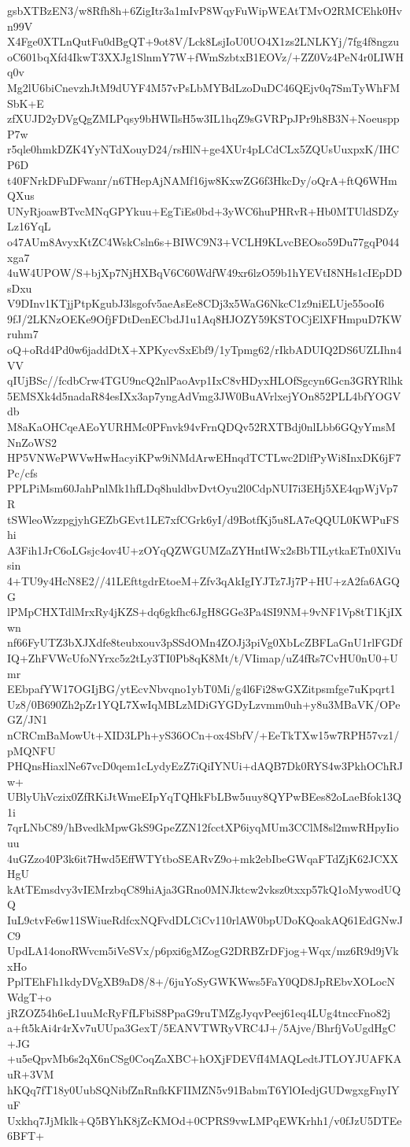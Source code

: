 gsbXTBzEN3/w8Rfh8h+6ZigItr3a1mIvP8WqyFuWipWEAtTMvO2RMCEhk0Hvn99V
X4Fge0XTLnQutFu0dBgQT+9ot8V/Lck8LsjIoU0UO4X1zs2LNLKYj/7fg4f8ngzu
oC601bqXfd4IkwT3XXJg1SlnmY7W+fWmSzbtxB1EOVz/+ZZ0Vz4PeN4r0LIWHq0v
Mg2lU6biCnevzhJtM9dUYF4M57vPsLbMYBdLzoDuDC46QEjv0q7SmTyWhFMSbK+E
zfXUJD2yDVgQgZMLPqsy9bHWIlsH5w3IL1hqZ9sGVRPpJPr9h8B3N+NoeusppP7w
r5qle0hmkDZK4YyNTdXouyD24/rsHlN+ge4XUr4pLCdCLx5ZQUsUuxpxK/IHCP6D
t40FNrkDFuDFwanr/n6THepAjNAMf16jw8KxwZG6f3HkcDy/oQrA+ftQ6WHmQXus
UNyRjoawBTvcMNqGPYkuu+EgTiEs0bd+3yWC6huPHRvR+Hb0MTUldSDZyLz16YqL
o47AUm8AvyxKtZC4WskCsln6s+BIWC9N3+VCLH9KLvcBEOso59Du77gqP044xga7
4uW4UPOW/S+bjXp7NjHXBqV6C60WdfW49xr6lzO59b1hYEVtI8NHs1cIEpDDsDxu
V9DInv1KTjjPtpKgubJ3lsgofv5aeAsEe8CDj3x5WaG6NkcC1z9niELUje55ooI6
9fJ/2LKNzOEKe9OfjFDtDenECbdJ1u1Aq8HJOZY59KSTOCjElXFHmpuD7KWruhm7
oQ+oRd4Pd0w6jaddDtX+XPKycvSxEbf9/1yTpmg62/rIkbADUIQ2DS6UZLIhn4VV
qIUjBSc//fcdbCrw4TGU9ncQ2nlPaoAvp1IxC8vHDyxHLOfSgcyn6Gcn3GRYRlhk
5EMSXk4d5nadaR84esIXx3ap7yngAdVmg3JW0BuAVrlxejYOn852PLL4bfYOGVdb
M8aKaOHCqeAEoYURHMc0PFnvk94vFrnQDQv52RXTBdj0nlLbb6GQyYmsMNnZoWS2
HP5VNWePWVwHwHacyiKPw9iNMdArwEHnqdTCTLwc2DlfPyWi8InxDK6jF7Pc/cfs
PPLPiMsm60JahPnlMk1hfLDq8huldbvDvtOyu2l0CdpNUI7i3EHj5XE4qpWjVp7R
tSWleoWzzpgjyhGEZbGEvt1LE7xfCGrk6yI/d9BotfKj5u8LA7eQQUL0KWPuFShi
A3Fih1JrC6oLGsjc4ov4U+zOYqQZWGUMZaZYHntIWx2sBbTILytkaETn0XlVusin
4+TU9y4HcN8E2//41LEfttgdrEtoeM+Zfv3qAkIgIYJTz7Jj7P+HU+zA2fa6AGQG
lPMpCHXTdlMrxRy4jKZS+dq6gkfhc6JgH8GGe3Pa4SI9NM+9vNF1Vp8tT1KjIXwn
nf66FyUTZ3bXJXdfe8teubxouv3pSSdOMn4ZOJj3piVg0XbLcZBFLaGnU1rlFGDf
IQ+ZhFVWcUfoNYrxc5z2tLy3TI0Pb8qK8Mt/t/VIimap/uZ4fRs7CvHU0nU0+Umr
EEbpafYW17OGIjBG/ytEcvNbvqno1ybT0Mi/g4l6Fi28wGXZitpsmfge7uKpqrt1
Uz8/0B690Zh2pZr1YQL7XwIqMBLzMDiGYGDyLzvmm0uh+y8u3MBaVK/OPeGZ/JN1
nCRCmBaMowUt+XID3LPh+yS36OCn+ox4SbfV/+EeTkTXw15w7RPH57vz1/pMQNFU
PHQnsHiaxlNe67vcD0qem1cLydyEzZ7iQiIYNUi+dAQB7Dk0RYS4w3PkhOChRJw+
UBlyUhVczix0ZfRKiJtWmeEIpYqTQHkFbLBw5uuy8QYPwBEes82oLaeBfok13Q1i
7qrLNbC89/hBvedkMpwGkS9GpeZZN12fcctXP6iyqMUm3CClM8sl2mwRHpyIiouu
4uGZzo40P3k6it7Hwd5EffWTYtboSEARvZ9o+mk2ebIbeGWqaFTdZjK62JCXXHgU
kAtTEmsdvy3vIEMrzbqC89hiAja3GRno0MNJktcw2vksz0txxp57kQ1oMywodUQQ
IuL9ctvFe6w11SWiueRdfcxNQFvdDLCiCv110rlAW0bpUDoKQoakAQ61EdGNwJC9
UpdLA14onoRWvcm5iVeSVx/p6pxi6gMZogG2DRBZrDFjog+Wqx/mz6R9d9jVkxHo
PplTEhFh1kdyDVgXB9aD8/8+/6juYoSyGWKWws5FaY0QD8JpREbvXOLocNWdgT+o
jRZOZ54h6eL1uuMcRyFfLFbiS8PpaG9ruTMZgJyqvPeej61eq4LUg4tnccFno82j
a+ft5kAi4r4rXv7uUUpa3GexT/5EANVTWRyVRC4J+/5Ajve/BhrfjVoUgdHgC+JG
+u5eQpvMb6s2qX6nCSg0CoqZaXBC+hOXjFDEVfI4MAQLedtJTLOYJUAFKAuR+3VM
hKQq7fT18y0UubSQNibfZnRnfkKFIIMZN5v91BabmT6YlOIedjGUDwgxgFnyIYuF
Uxkhq7JjMklk+Q5BYhK8jZcKMOd+0CPRS9vwLMPqEWKrhh1/v0fJzU5DTEe6BFT+
